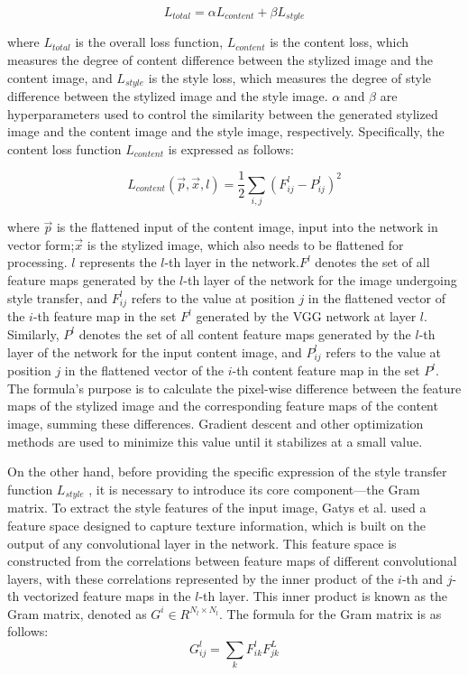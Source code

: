 \begin{equation}
    \label{Gatys_total_loss}
    L_{total}=\alpha L_{content}+ \beta L_{style}
\end{equation}

where $L_{total}$  is the overall loss function, $L_{content}$ is the content loss, which measures the degree of content difference between the stylized image and the content image, and $L_{style}$  is the style loss, which measures the degree of style difference between the stylized image and the style image. $\alpha$ and $\beta$ are hyperparameters used to control the similarity between the generated stylized image and the content image and the style image, respectively. Specifically, the content loss function $L_{content}$  is expressed as follows:

\begin{equation}
    \label{gatys_content_l}
    L_{content}\left(\vec{p},\vec{x},l\right)=\frac{1}{2} \sum_{i,j} \left(F_{ij}^l-P_{ij}^l\right)^2
\end{equation}

where $\vec{p}$ is the flattened input of the content image, input into the network in vector form;$\vec{x}$ is the stylized image, which also needs to be flattened for processing. $l$ represents the $l$-th layer in the network.$F^l$ denotes the set of all feature maps generated by the $l$-th layer of the network for the image undergoing style transfer, and $F_{ij}^l$ refers to the value at position $j$ in the flattened vector of the $i$-th feature map in the set $F^l$ generated by the VGG \citep{25simonyan2014very} network at layer $l$. Similarly, $P^l$ denotes the set of all content feature maps generated by the $l$-th layer of the network for the input content image, and $P_{ij}^l$ refers to the value at position $j$ in the flattened vector of the $i$-th content feature map in the set $P^l$. The formula's purpose is to calculate the pixel-wise difference between the feature maps of the stylized image and the corresponding feature maps of the content image, summing these differences. Gradient descent and other optimization methods are used to minimize this value until it stabilizes at a small value.

On the other hand, before providing the specific expression of the style transfer function $L_{style}$ , it is necessary to introduce its core component—the Gram matrix. To extract the style features of the input image, Gatys et al.\citep{02gatys2016image} used a feature space designed to capture texture information, which is built on the output of any convolutional layer in the network. This feature space is constructed from the correlations between feature maps of different convolutional layers, with these correlations represented by the inner product of the $i$-th and $j$-th vectorized feature maps in the $l$-th layer. This inner product is known as the Gram matrix, denoted as $G^i \in R^{N_l\times N_l}$. The formula for the Gram matrix is as follows:
\begin{equation}
    G_{ij}^l=\sum_k F_{ik}^lF_{jk}^L
\end{equation}

